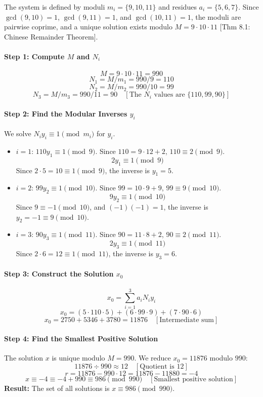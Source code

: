 \begin{solution}
The system is defined by moduli $m_i = \{9, 10, 11\}$ and residues $a_i = \{5, 6, 7\}$. Since $\gcd(9, 10) = 1$, $\gcd(9, 11) = 1$, and $\gcd(10, 11) = 1$, the moduli are pairwise coprime, and a unique solution exists modulo $M=9 \cdot 10 \cdot 11$ [Thm 8.1: Chinese Remainder Theorem].

\paragraph{Step 1: Compute $M$ and $N_i$}
$$ M = 9 \cdot 10 \cdot 11 = 990 $$
$$ N_1 = M/m_1 = 990/9 = 110 $$
$$ N_2 = M/m_2 = 990/10 = 99 $$
$$ N_3 = M/m_3 = 990/11 = 90 \quad [\text{The } N_i \text{ values are } \{110, 99, 90\}] \text{}$$

\paragraph{Step 2: Find the Modular Inverses $y_i$}
We solve $N_i y_i \equiv 1 \pmod{m_i}$ for $y_i$.
\begin{itemize}
    \item $i=1$: $110 y_1 \equiv 1 \pmod{9}$. Since $110 = 9 \cdot 12 + 2$, $110 \equiv 2 \pmod{9}$.
    $$ 2 y_1 \equiv 1 \pmod{9} $$
    Since $2 \cdot 5 = 10 \equiv 1 \pmod{9}$, the inverse is $y_1 = 5$.
    
    \item $i=2$: $99 y_2 \equiv 1 \pmod{10}$. Since $99 = 10 \cdot 9 + 9$, $99 \equiv 9 \pmod{10}$.
    $$ 9 y_2 \equiv 1 \pmod{10} $$
    Since $9 \equiv -1 \pmod{10}$, and $(-1)(-1) = 1$, the inverse is $y_2 = -1 \equiv 9 \pmod{10}$.
    
    \item $i=3$: $90 y_3 \equiv 1 \pmod{11}$. Since $90 = 11 \cdot 8 + 2$, $90 \equiv 2 \pmod{11}$.
    $$ 2 y_3 \equiv 1 \pmod{11} $$
    Since $2 \cdot 6 = 12 \equiv 1 \pmod{11}$, the inverse is $y_3 = 6$.
\end{itemize}
\paragraph{Step 3: Construct the Solution $x_0$}
$$ x_0 = \sum_{i=1}^3 a_i N_i y_i $$
$$ x_0 = (5 \cdot 110 \cdot 5) + (6 \cdot 99 \cdot 9) + (7 \cdot 90 \cdot 6) $$
$$ x_0 = 2750 + 5346 + 3780 = 11876 \quad [\text{Intermediate sum}] $$

\paragraph{Step 4: Find the Smallest Positive Solution}
The solution $x$ is unique modulo $M=990$. We reduce $x_0 = 11876$ modulo $990$:
$$ 11876 \div 990 \approx 12 \quad [\text{Quotient is } 12] \text{}$$
$$ r = 11876 - 990 \cdot 12 = 11876 - 11880 = -4 $$
$$ x \equiv -4 \equiv -4 + 990 \equiv 986 \pmod{990} \quad [\text{Smallest positive solution}] $$
\textbf{Result:} The set of all solutions is $x \equiv 986 \pmod{990}$.
\end{solution}